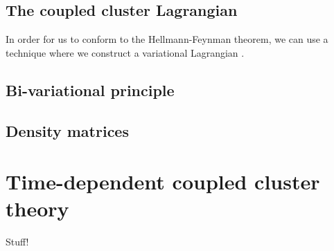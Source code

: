         \subsection{The coupled cluster Lagrangian}
            In order for us to conform to the Hellmann-Feynman theorem, we can
            use a technique where we construct a variational Lagrangian
            \cite{helgaker1989}.

        \subsection{Bi-variational principle}
        \subsection{Density matrices}

    \section{Time-dependent coupled cluster theory}
        Stuff!

